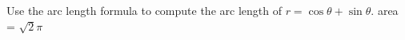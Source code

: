 {Use the arc length formula to compute the arc length of $r=\cos \theta+\sin \theta$.
}
{area = $\sqrt{2}\pi$
}
